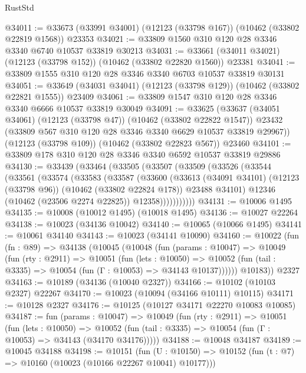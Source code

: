 \begin{lexlean}{RustStd}
\begin{coremodule}
@34011 := @33673 (@33991 @34001) (@12123 (@33798 @167)) (@10462 (@33802 @22819 @1568)) @23353
@34021 := @33809 @1560 @310 @120 @28 @3346 @3340 @6740 @10537 @33819 @30213
@34031 := @33661 (@34011 @34021) (@12123 (@33798 @152)) (@10462 (@33802 @22820 @1560)) @23381
@34041 := @33809 @1555 @310 @120 @28 @3346 @3340 @6703 @10537 @33819 @30131
@34051 := @33649 (@34031 @34041) (@12123 (@33798 @129)) (@10462 (@33802 @22821 @1555)) @23409
@34061 := @33809 @1547 @310 @120 @28 @3346 @3340 @6666 @10537 @33819 @30049
@34091 := @33625
    (@33637
      (@34051 @34061)
      (@12123 (@33798 @47))
      (@10462 (@33802 @22822 @1547))
      @23432
      (@33809 @567 @310 @120 @28 @3346 @3340 @6629 @10537 @33819 @29967))
    (@12123 (@33798 @109))
    (@10462 (@33802 @22823 @567))
    @23460
@34101 := @33809 @178 @310 @120 @28 @3346 @3340 @6592 @10537 @33819 @29886
@34130 := @33439
    (@33464
      (@33505
        (@33507
          (@33509
            (@33526
              (@33544
                (@33561
                  (@33574
                    (@33583
                      (@33587
                        (@33600
                          (@33613
                            (@34091 @34101)
                            (@12123 (@33798 @96))
                            (@10462 (@33802 @22824 @178))
                            @23488
                            @34101)
                          @12346
                          (@10462 (@23506 @2274 @22825))
                          @12358)))))))))))
@34131 := @10006 @1495
@34135 := @10008 (@10012 @1495) (@10018 @1495)
@34136 := @10027 @22264
@34138 := @10023 (@34136 @10042)
@34140 := @10065 (@10066 @1495)
@34141 := @10061 @34140
@34143 := @10023 (@34141 @10090)
@34160 := @10022
    (fun (fn : @89) =>
    @34138
      (@10045
        (@10048
          (fun (params : @10047) =>
          @10049
            (fun (rty : @2911) =>
            @10051
              (fun (lets : @10050) =>
              @10052 (fun (tail : @3335) => @10054 (fun (Γ : @10053) => @34143 @10137))))))
        @10183))
    @2327
@34163 := @10189 (@34136 (@10040 @2327))
@34166 := @10102 (@10103 @2327) @22267
@34170 := @10023 (@10094 (@34166 @10111) @10115)
@34171 := @10128 @2327
@34176 := @10125 (@10127 @34171 @22270 @10083 @10085)
@34187 := fun (params : @10047) =>
  @10049
    (fun (rty : @2911) =>
    @10051
      (fun (lets : @10050) =>
      @10052 (fun (tail : @3335) => @10054 (fun (Γ : @10053) => @34143 (@34170 @34176)))))
@34188 := @10048 @34187
@34189 := @10045 @34188
@34198 := @10151
    (fun (U : @10150) => @10152 (fun (t : @7) => @10160 (@10023 (@10166 @22267 @10041) @10177)))

\end{coremodule}
\end{lexlean}
